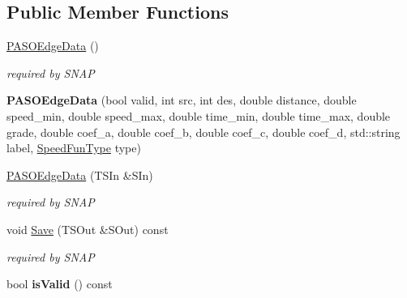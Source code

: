 \subsection*{Public Member Functions}
\begin{DoxyCompactItemize}
\item 
\hypertarget{class_p_a_s_o_edge_data_ab7a3a0421b449a251ba55cc761eec5a8}{}\hyperlink{class_p_a_s_o_edge_data_ab7a3a0421b449a251ba55cc761eec5a8}{P\+A\+S\+O\+Edge\+Data} ()\label{class_p_a_s_o_edge_data_ab7a3a0421b449a251ba55cc761eec5a8}

\begin{DoxyCompactList}\small\item\em required by S\+N\+A\+P \end{DoxyCompactList}\item 
\hypertarget{class_p_a_s_o_edge_data_a62a80ea67e25bc971b11071b4ba8c965}{}{\bfseries P\+A\+S\+O\+Edge\+Data} (bool valid, int src, int des, double distance, double speed\+\_\+min, double speed\+\_\+max, double time\+\_\+min, double time\+\_\+max, double grade, double coef\+\_\+a, double coef\+\_\+b, double coef\+\_\+c, double coef\+\_\+d, std\+::string label, \hyperlink{class_p_a_s_o_edge_data_a30164e651874b10a410d96616c7b4077}{Speed\+Fun\+Type} type)\label{class_p_a_s_o_edge_data_a62a80ea67e25bc971b11071b4ba8c965}

\item 
\hypertarget{class_p_a_s_o_edge_data_adee3bcaa9a71243b60228de67570e367}{}\hyperlink{class_p_a_s_o_edge_data_adee3bcaa9a71243b60228de67570e367}{P\+A\+S\+O\+Edge\+Data} (T\+S\+In \&S\+In)\label{class_p_a_s_o_edge_data_adee3bcaa9a71243b60228de67570e367}

\begin{DoxyCompactList}\small\item\em required by S\+N\+A\+P \end{DoxyCompactList}\item 
\hypertarget{class_p_a_s_o_edge_data_a1430549750f1fa78f9f8f4a26be81f01}{}void \hyperlink{class_p_a_s_o_edge_data_a1430549750f1fa78f9f8f4a26be81f01}{Save} (T\+S\+Out \&S\+Out) const \label{class_p_a_s_o_edge_data_a1430549750f1fa78f9f8f4a26be81f01}

\begin{DoxyCompactList}\small\item\em required by S\+N\+A\+P \end{DoxyCompactList}\item 
\hypertarget{class_p_a_s_o_edge_data_aaf9bac53a03236923589c8196e2039d7}{}bool {\bfseries is\+Valid} () const \label{class_p_a_s_o_edge_data_aaf9bac53a03236923589c8196e2039d7}


\end{DoxyCompactItemize}
